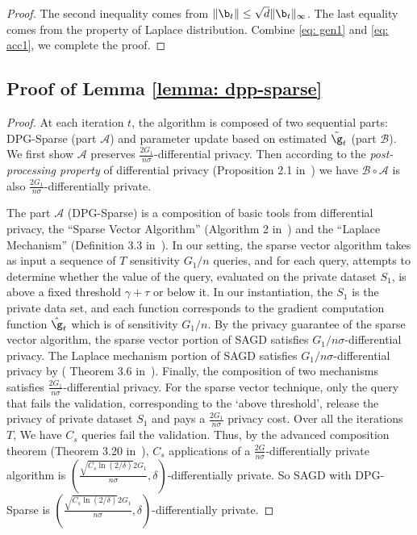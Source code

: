 \begin{proof}
The second inequality comes from $\|\b_t\| \leq \sqrt{d}\|\b_t\|_\infty$. The
last equality comes from the property of Laplace distribution. Combine \eqref{eq: gen1} and \eqref{eq: acc1}, we complete the proof.
\end{proof}

\subsection{Proof of Lemma \ref{lemma: dpp-sparse}}

\lemdppsparse*

\begin{proof}
At each iteration $t$, the algorithm is composed of two sequential parts: DPG-Sparse (part $\mathcal{A}$) and parameter update based on estimated $\tilde \g_t$ (part $\mathcal{B}$).
We first show $\mathcal{A}$ preserves $\frac{2G_1}{n\sigma}$-differential privacy. Then according to the \emph{post-processing property} of differential privacy (Proposition 2.1 in~\cite{dwro2014}) we have $\mathcal{B} \circ \mathcal{A}$ is also $\frac{2G_1}{n\sigma}$-differentially private.
	
The part $\mathcal{A}$ (DPG-Sparse) is a composition of basic tools from differential privacy, the ``Sparse Vector Algorithm'' (Algorithm 2 in~\citep{dwro2014}) and the ``Laplace Mechanism'' (Definition 3.3 in~\citep{dwro2014}). In our setting, the sparse vector algorithm takes as input a sequence of $T$ sensitivity $G_1/n$ queries, and for each query, attempts to determine whether the value of the query, evaluated on the private dataset $S_1$, is above a fixed threshold $\gamma + \tau$ or below it. In our instantiation, the  $S_1$ is the private data set, and each function corresponds to the gradient computation function $ \hat \g_t$ which is of sensitivity $G_1/n$. 
By the privacy guarantee of the sparse vector algorithm, the sparse vector portion of SAGD satisfies $G_1/n\sigma$-differential privacy. The Laplace mechanism portion of SAGD
satisfies $G_1/n\sigma$-differential privacy by ( Theorem 3.6 in~\cite{dwro2014}). Finally, the composition of two mechanisms satisfies $\frac{2G_1}{n\sigma}$-differential privacy. For the sparse vector technique, only the query that fails the validation, corresponding to the `above threshold', release the privacy
of private dataset $S_1$ and pays a $\frac{2G_1}{n\sigma}$ privacy cost. 
Over all the iterations $T$, We have $C_{s}$ queries fail the validation.
Thus, by the advanced composition theorem (Theorem 3.20 in~\cite{dwro2014}), $C_{s}$ applications of a $\frac{2G}{n\sigma}$-differentially private algorithm is  $(\frac{\sqrt{C_{s} \ln(2/\delta)} 2G_1}{n\sigma}, \delta)$-differentially private. So SAGD with DPG-Sparse is $(\frac{\sqrt{C_{s} \ln(2/\delta)} 2G_1}{n\sigma}, \delta)$-differentially private.
\end{proof}
